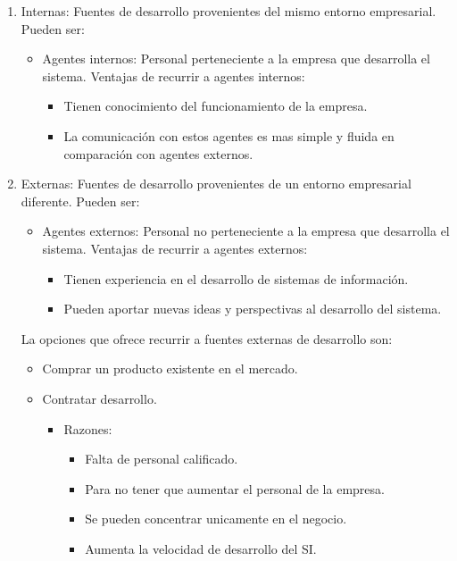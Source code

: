 \documentclass{templateNote}
\begin{document}
\begin{enumerate}
    \item Internas: Fuentes de desarrollo provenientes del mismo entorno empresarial. Pueden ser:
    \begin{itemize}
        \item Agentes internos: Personal perteneciente a la empresa que desarrolla el sistema. Ventajas de recurrir a agentes internos:
        \begin{itemize}
            \item Tienen conocimiento del funcionamiento de la empresa.
            \item La comunicación con estos agentes es mas simple y fluida en comparación con agentes externos.
        \end{itemize}
    \end{itemize}
    \item Externas: Fuentes de desarrollo provenientes de un entorno empresarial diferente. Pueden ser:
    \begin{itemize}
        \item Agentes externos: Personal no perteneciente a la empresa que desarrolla el sistema. Ventajas de recurrir a agentes externos:
        \begin{itemize}
            \item Tienen experiencia en el desarrollo de sistemas de información.
            \item Pueden aportar nuevas ideas y perspectivas al desarrollo del sistema.
        \end{itemize}
    \end{itemize}
    La opciones que ofrece recurrir a fuentes externas de desarrollo son:
    \begin{itemize}
        \item Comprar un producto existente en el mercado.
        \item Contratar desarrollo.
        \begin{itemize}
            \item Razones:
            \begin{itemize}
                \item Falta de personal calificado.
                \item Para no tener que aumentar el personal de la empresa.
                \item Se pueden concentrar unicamente en el negocio.
                \item Aumenta la velocidad de desarrollo del SI.

\end{itemize}
\end{itemize}
\end{itemize}
\end{enumerate}
\end{document}
